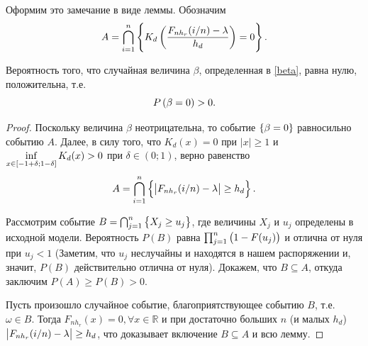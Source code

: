 \documentclass[a4paper,14pt,russian]{article}
\begin{document}
Оформим это замечание в виде леммы.
Обозначим
\begin{equation}
  A = \bigcap_{i=1}^n \left\{K_d\left(\frac{F_{n h_r}(i/n)-\lambda}{h_d}\right) = 0\right\}.
  \label{A}
\end{equation}
\begin{lemma}
  Вероятность того, что случайная величина $\beta $, определенная в \eqref{beta}, равна нулю, положительна, т.е.
  $$
  P\left(\beta = 0\right) >0.
  $$
\end{lemma}
\begin{proof}
  Поскольку величина $\beta$ неотрицательна, то событие $\left\{\beta = 0\right\}$ равносильно событию $A$.
  Далее, в силу того, что $K_d(x) =0$ при $|x|\geq 1$ и $\inf \limits_{x \in \left[-1+\delta;1-\delta\right]} K_d(x)>0$ при $\delta \in (0;1)$, верно равенство
  $$
  A = \bigcap_{i=1}^n \left\{\left|F_{n h_r}(i/n)-\lambda\right|\geq h_d\right\}.
  $$

  Рассмотрим событие $B = \bigcap_{j=1}^n \left\{X_j \geq u_j\right\}$, где величины $X_j$ и $u_j$ определены в исходной модели. Вероятность $P(B)$ равна $\prod_{j=1}^n \left(1-F(u_j)\right)$ и отлична от нуля при $u_j < 1$ (Заметим, что $u_j$ неслучайны и находятся в нашем распоряжении и, значит, $P(B)$ действительно отлична от нуля). Докажем, что $B \subseteq A$, откуда заключим $P(A) \geq P(B) > 0$.

  Пусть произошло случайное событие, благоприятствующее событию $B$, т.е. $\omega \in B$. Тогда $F_{n h_r}(x) = 0, \forall x \in \mathbb{R}$ и при достаточно больших $n$ (и малых $h_d$) $\left|F_{n h_r}(i/n) -\lambda\right| \geq h_d$, что доказывает включение $B \subseteq A$ и всю лемму.
\end{proof}
\end{document}
